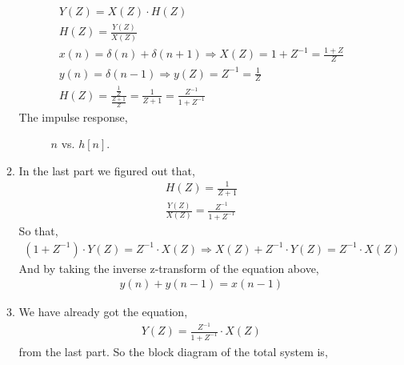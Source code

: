 \documentclass[10pt,a4paper, margin=1in]{article}
\begin{document}
\begin{enumerate}
\begin{enumerate}
    \begin{align*}
        Y(Z) = X(Z) \cdot H(Z) \\
        H(Z) = \frac{Y(Z)}{X(Z)} \\ 
        x(n) = \delta(n) + \delta(n+1) \Longrightarrow X(Z) = 1 + Z^{-1} = \frac{1+ Z}{Z} \\
        y(n) = \delta(n-1) \Longrightarrow y(Z) = Z^{-1} = \frac{1}{Z} \\
        H(Z) = \frac{\frac{1}{Z}}{\frac{Z+1}{Z}} = \frac{1}{Z+1} = \frac{Z^{-1}}{1+ Z^{-1}}
    \end{align*}
    The impulse response, \\
    \begin{figure} [h!]
        \centering
        \caption{$n$ vs. $h[n]$.}
        \label{fig:q2}
    \end{figure}
    
    \item %
    In the last part we figured out that,
    \begin{align*}
        H(Z) = \frac{1}{Z+1} \\
        \frac{Y(Z)}{X(Z)} = \frac{Z^{-1}}{1+ Z^{-1}}
    \end{align*}
    So that, 
    \begin{align*}
        (1 + Z^{-1}) \cdot Y(Z) = Z^{-1} \cdot X(Z) \Longrightarrow X(Z) + Z^{-1} \cdot Y(Z) = Z^{-1} \cdot X(Z)
    \end{align*}
    And by taking the inverse z-transform of the equation above,
    \begin{align}
        y(n) + y(n-1) = x(n-1)
    \end{align}
    
    \item %
    We have already got the equation, 
    \begin{align}
        Y(Z) = \frac{Z^{-1}}{1 + Z^{-1}} \cdot X(Z)
    \end{align}
    from the last part.
    So the block diagram of the total system is, \\
    

\end{enumerate}
\end{enumerate}
\end{document}
